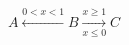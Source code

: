 \documentclass[nofonts]{ctexart}
\begin{document}
\[
	A \xleftarrow{0<x<1} B \xrightarrow[x \leq 0]{x \geq 1} C
\]
\end{document}
